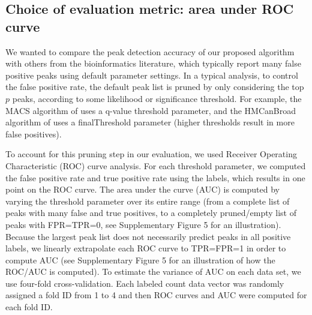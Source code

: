 \documentclass[twoside,11pt]{article}
\begin{document}
%   




\subsection{Choice of evaluation metric: area under ROC curve}

We wanted to compare the peak detection accuracy of our proposed
algorithm with others from the bioinformatics literature, which
typically report many false positive peaks using default parameter
settings. 
In a typical analysis, to control the false
positive rate, the default peak list is pruned by only considering the
top $p$ peaks, according to some likelihood or significance
threshold. For example, the MACS algorithm of \citet{MACS} uses a
q-value threshold parameter, and the HMCanBroad algorithm of
\citet{HMCan} uses a finalThreshold parameter (higher thresholds
result in more false positives).

To account for this pruning step in our evaluation, we used Receiver
Operating Characteristic (ROC) curve analysis. For each threshold
parameter, we computed the false positive rate and true positive rate
using the labels, which results in one point on the ROC curve. The
area under the curve (AUC) is computed by varying the threshold
parameter over its entire range (from a complete list of peaks with
many false and true positives, to a completely pruned/empty list of
peaks with FPR=TPR=0, see Supplementary Figure 5 for an illustration).
Because the largest peak list does not necessarily predict peaks in
all positive labels, we linearly extrapolate each ROC curve to
TPR=FPR=1 in order to compute AUC (see Supplementary Figure 5 for an
illustration of how the ROC/AUC is computed). To estimate the variance
of AUC on each data set, we use four-fold cross-validation. Each
labeled count data vector was randomly assigned a fold ID from 1 to 4
and then ROC curves and AUC were computed for each fold ID.
\end{document}
